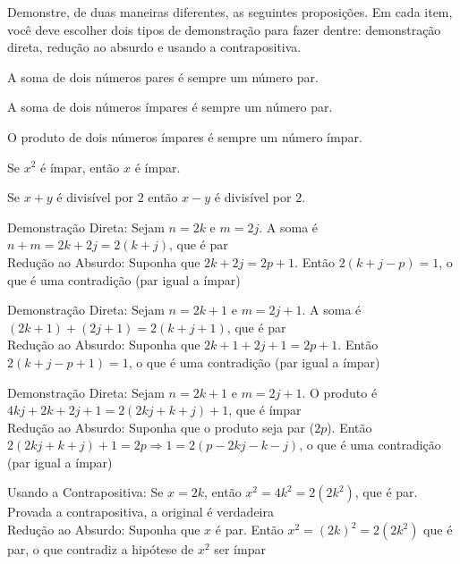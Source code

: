 \begin{exercises*}
\begin{exercise}
  Demonstre, de duas maneiras diferentes, as seguintes proposições. Em
  cada item, você deve escolher dois tipos de demonstração para fazer
  dentre: demonstração direta, redução ao absurdo e usando a
  contrapositiva.
  \begin{alphalist}
    \item A soma de dois números pares é sempre um número par.
    \item A soma de dois números ímpares é sempre um número par.
    \item O produto de dois números ímpares é sempre um número ímpar.
    \item Se $x^2$ é ímpar, então $x$ é ímpar.
    \item Se $x+y$ é divisível por $2$ então $x-y$ é divisível por $2$.
  \end{alphalist}

  \begin{answer}
    \begin{alphalist}
        \item
            Demonstração Direta:
            Sejam $n = 2k$ e $m = 2j$.
            A soma é $n + m = 2k + 2j = 2(k + j)$, que é par \\
            Redução ao Absurdo: Suponha que $2k + 2j = 2p + 1$.
            Então $2(k + j - p) = 1$, o que é uma contradição (par igual a ímpar)

        \item
            Demonstração Direta:
            Sejam $n = 2k + 1$ e $m = 2j + 1$.
            A soma é $(2k + 1) + (2j + 1) = 2(k + j + 1)$, que é par \\
            Redução ao Absurdo:
            Suponha que $2k+1 + 2j+1 = 2p + 1$.
            Então $2(k + j - p +1) = 1$, o que é uma contradição (par igual a ímpar)

        \item
            Demonstração Direta:
            Sejam $n = 2k + 1$ e $m = 2j + 1$.
            O produto é $4kj + 2k + 2j + 1 = 2(2kj + k + j) + 1$, que é ímpar \\
            Redução ao Absurdo:
            Suponha que o produto seja par ($2p$).
            Então $2(2kj+k+j) + 1 = 2p \Rightarrow 1 = 2(p - 2kj - k - j)$,
            o que é uma contradição (par igual a ímpar)

        \item
            Usando a Contrapositiva:
            Se $x=2k$, então $x^2 = 4k^2 = 2(2k^2)$, que é par.
            Provada a contrapositiva, a original é verdadeira \\
            Redução ao Absurdo:
            Suponha que $x$ é par.
            Então $x^2 = (2k)^2 = 2(2k^2)$ que é par,
            o que contradiz a hipótese de $x^2$ ser ímpar


\end{alphalist}
\end{answer}
\end{exercise}
\end{exercises*}
